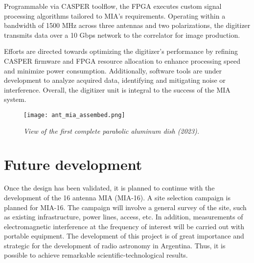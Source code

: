 \documentclass[baaa]{baaa}
\begin{document}
Programmable via CASPER toolflow, the FPGA executes custom signal processing algorithms tailored to MIA's requirements. Operating within a bandwidth of 1500 MHz across three antennas and two polarizations, the digitizer transmits data over a 10 Gbps network to the correlator for image production.

Efforts are directed towards optimizing the digitizer's performance by refining CASPER firmware and FPGA resource allocation to enhance processing speed and minimize power consumption. Additionally, software tools are under development to analyze acquired data, identifying and mitigating noise or interference. Overall, the digitizer unit is integral to the success of the MIA system.

\begin{figure}[!t]
  \texttt{[image: ant\_mia\_assembed.png]}
  \caption{\emph{View of the first complete parabolic aluminum dish (2023).}}
  \label{fig:complete}
\end{figure}

\section{Future development}
Once the design has been validated, it is planned to continue with the development of the 16 antenna MIA (MIA-16). A site selection campaign is planned for MIA-16. The campaign will involve a general survey of the site, such as existing infrastructure, power lines, access, etc. In addition, measurements of electromagnetic interference at the frequency of interest will be carried out with portable equipment. The development of this project is of great importance and strategic for the development of radio astronomy in Argentina. Thus, it is possible to achieve remarkable scientific-technological results.
\end{document}
